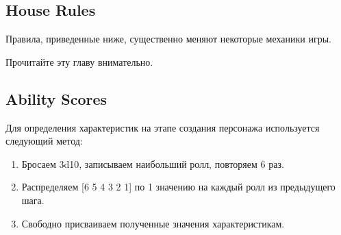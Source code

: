 \documentclass[a4paper,11pt]{book}
\let\oldtabularx\tabularx
\let\endoldtabularx\endtabularx
\renewenvironment{tabularx}{
        \AlegreyaSansOsF
        \bigskip
        \noindent
        \rowcolors{2}{}{white!94!blue}
        \oldtabularx
        } {
        \endoldtabularx
        \medskip
        }
\begin{document}
\begin{multicols}{2}
\chapter{House Rules}

Правила, приведенные ниже, существенно меняют некоторые механики игры.

Прочитайте эту главу внимательно.

\section{Ability Scores}

Для определения характеристик на этапе создания персонажа используется следующий метод:

\begin{enumerate}
    \item Бросаем 3d10, записываем наибольший ролл, повторяем 6 раз.
    \item Распределяем [6 5 4 3 2 1] по 1 значению на каждый ролл из предыдущего шага.
    \item Свободно присваиваем полученные значения характеристикам.
\end{enumerate}

%
%
%
%


\end{multicols}
\end{document}
